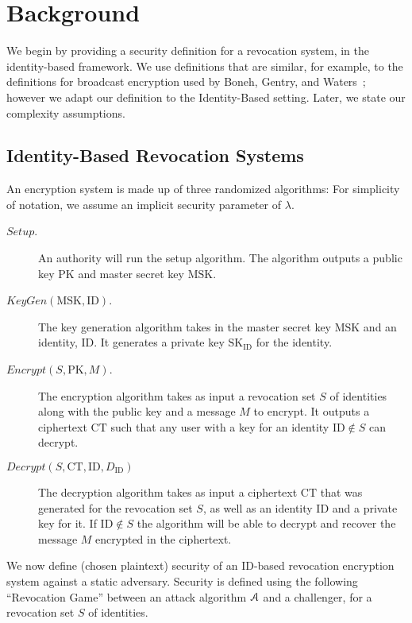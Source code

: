 \documentclass[a4paper, 11pt]{article}
\theoremstyle{definition}
\newcommand{\AlgSetup}{\ensuremath{\textit{Setup}}}
\newcommand{\AlgKeyGen}{\ensuremath{\textit{KeyGen}}}
\newcommand{\AlgEncrypt}{\ensuremath{\textit{Encrypt}}}
\newcommand{\AlgDecrypt}{\ensuremath{\textit{Decrypt}}}
\newcommand{\AlgA}{\ensuremath{{\cal A}}}
\newcommand{\SK}{\ensuremath{\textrm{SK}}}
\newcommand{\MSK}{\ensuremath{\textrm{MSK}}}
\newcommand{\PK}{\ensuremath{\textrm{PK}}}
\newcommand{\ID}{\ensuremath{\textrm{ID}}}
\newcommand{\CT}{\ensuremath{\textrm{CT}}}
\begin{document}
\section{Background}
\label{sec:background}

We begin by providing a security definition for a revocation system,
in the identity-based framework. We use definitions that are similar,
for example, to the definitions for broadcast encryption used by
Boneh, Gentry, and Waters~\cite{BGW05}; however we adapt our
definition to the Identity-Based setting. Later, we state our
complexity assumptions.


\subsection{Identity-Based Revocation Systems}

An  encryption system is made up of three randomized algorithms:
For simplicity of notation, we assume an implicit security parameter
of $\lambda$.
\begin{description}
\item[$\AlgSetup$.] An authority will run the setup algorithm.
The algorithm outputs a  public key $\PK$ and master secret key $\MSK$.

\item[$\AlgKeyGen(\MSK,\ID)$.] The key generation algorithm takes in the
master secret key $\MSK$ and an identity, $\ID$. It generates a private
key $\SK_{\ID}$ for the identity.


\item[$\AlgEncrypt(S,\PK,M)$.]
The encryption algorithm takes as input a revocation set $S$ of identities
along with the public key and a message $M$ to encrypt. It outputs a
ciphertext $\CT$ such that any user with a key for an identity $\ID \notin S$
can decrypt.


\item[$\AlgDecrypt(S,\CT,\ID,D_{\ID})$]
The decryption algorithm takes as input a ciphertext $\CT$ that was generated for the revocation
set $S$, as well as an identity $\ID$ and a private key for it. If $\ID \notin S$ the
algorithm will be able to decrypt and recover the message $M$ encrypted in the ciphertext.
\end{description}


We now define (chosen plaintext) security of an ID-based revocation encryption system
against a static adversary. Security is defined using the following
``Revocation Game'' between an attack algorithm $\AlgA$ and a challenger, for a revocation set $S$ of identities.
\end{document}
